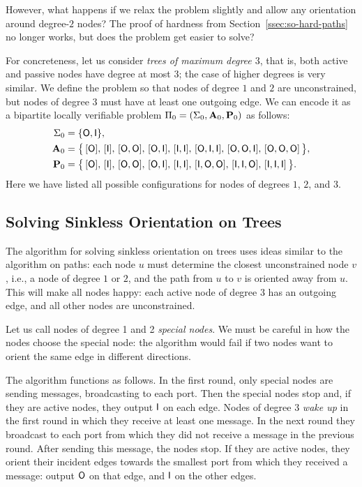 However, what happens if we relax the problem slightly and allow any orientation around degree-$2$ nodes? The proof of hardness from Section~\ref{ssec:so-hard-paths} no longer works, but does the problem get easier to solve?

For concreteness, let us consider \emph{trees of maximum degree $3$}, that is, both active and passive nodes have degree at most $3$; the case of higher degrees is very similar. We define the problem so that nodes of degree $1$ and $2$ are unconstrained, but nodes of degree $3$ must have at least one outgoing edge. We can encode it as a bipartite locally verifiable problem $\Pi_0 = (\Sigma_0, \mathbf{A}_0, \mathbf{P}_0)$ as follows:
\begin{align*}
	\Sigma_0 &= \{ \mathsf{O}, \mathsf{I} \}, \\
	\mathbf{A}_0 &= \bigl\{ \, [\mathsf{O}],\,[\mathsf{I}],\,[\mathsf{O}, \mathsf{O}],\,[\mathsf{O},\mathsf{I}],\,[\mathsf{I},\mathsf{I}],\,[\mathsf{O},\mathsf{I},\mathsf{I}],\,[\mathsf{O},\mathsf{O},\mathsf{I}],\,[\mathsf{O},\mathsf{O},\mathsf{O}] \, \bigr\}, \\
	\mathbf{P}_0 &= \bigl\{ \, [\mathsf{O}],\,[\mathsf{I}],\,[\mathsf{O}, \mathsf{O}],\,[\mathsf{O},\mathsf{I}],\,[\mathsf{I},\mathsf{I}],\,[\mathsf{I},\mathsf{O},\mathsf{O}],\,[\mathsf{I},\mathsf{I},\mathsf{O}],\,[\mathsf{I},\mathsf{I},\mathsf{I}] \, \bigr\}.
\end{align*}
Here we have listed all possible configurations for nodes of degrees $1$, $2$, and $3$.

\subsection{Solving Sinkless Orientation on Trees} \label{ssec:so-trees-alg}

The algorithm for solving sinkless orientation on trees uses ideas similar to the algorithm on paths: each node $u$ must determine the closest unconstrained node $v$, i.e., a node of degree $1$ or $2$, and the path from $u$ to $v$ is oriented away from $u$. This will make all nodes happy: each active node of degree $3$ has an outgoing edge, and all other nodes are unconstrained.

Let us call nodes of degree 1 and 2 \emph{special nodes}. We must be careful in how the nodes choose the special node: the algorithm would fail if two nodes want to orient the same edge in different directions.

The algorithm functions as follows. In the first round, only special nodes are sending messages, broadcasting to each port. Then the special nodes stop and, if they are active nodes, they output $\mathsf{I}$ on each edge. Nodes of degree 3 \emph{wake up} in the first round in which they receive at least one message. In the next round they broadcast to each port from which they did not receive a message in the previous round. After sending this message, the nodes stop. If they are active nodes, they orient their incident edges towards the smallest port from which they received a message: output $\mathsf{O}$ on that edge, and $\mathsf{I}$ on the other edges. 

